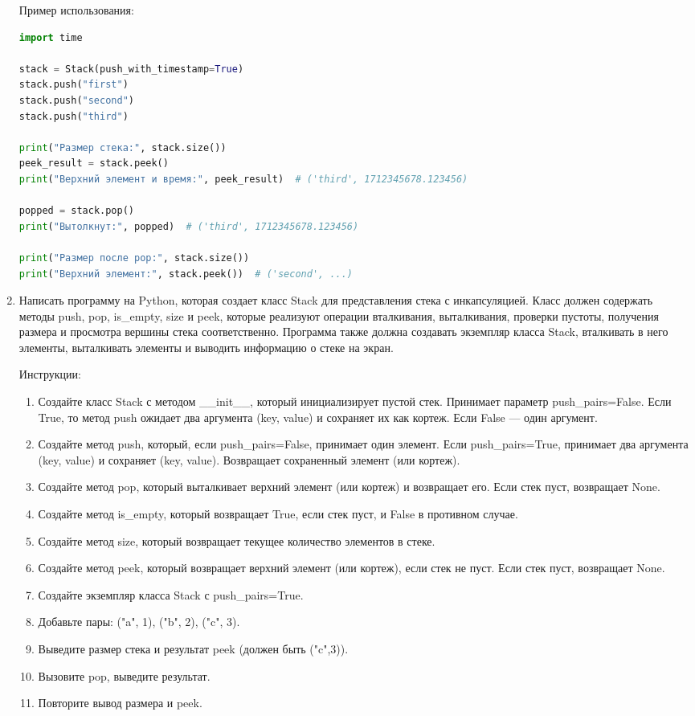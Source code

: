 \begin{enumerate}
Пример использования:
\begin{lstlisting}[language=Python]
import time

stack = Stack(push_with_timestamp=True)
stack.push("first")
stack.push("second")
stack.push("third")

print("Размер стека:", stack.size())
peek_result = stack.peek()
print("Верхний элемент и время:", peek_result)  # ('third', 1712345678.123456)

popped = stack.pop()
print("Вытолкнут:", popped)  # ('third', 1712345678.123456)

print("Размер после pop:", stack.size())
print("Верхний элемент:", stack.peek())  # ('second', ...)
\end{lstlisting}

\item Написать программу на Python, которая создает класс Stack для представления стека с инкапсуляцией. Класс должен содержать методы push, pop, is\_empty, size и peek, которые реализуют операции вталкивания, выталкивания, проверки пустоты, получения размера и просмотра вершины стека соответственно. Программа также должна создавать экземпляр класса Stack, вталкивать в него элементы, выталкивать элементы и выводить информацию о стеке на экран.

Инструкции:
\begin{enumerate}
    \item Создайте класс Stack с методом \_\_init\_\_, который инициализирует пустой стек. Принимает параметр push\_pairs=False. Если True, то метод push ожидает два аргумента (key, value) и сохраняет их как кортеж. Если False — один аргумент.
    \item Создайте метод push, который, если push\_pairs=False, принимает один элемент. Если push\_pairs=True, принимает два аргумента (key, value) и сохраняет (key, value). Возвращает сохраненный элемент (или кортеж).
    \item Создайте метод pop, который выталкивает верхний элемент (или кортеж) и возвращает его. Если стек пуст, возвращает None.
    \item Создайте метод is\_empty, который возвращает True, если стек пуст, и False в противном случае.
    \item Создайте метод size, который возвращает текущее количество элементов в стеке.
    \item Создайте метод peek, который возвращает верхний элемент (или кортеж), если стек не пуст. Если стек пуст, возвращает None.
    \item Создайте экземпляр класса Stack с push\_pairs=True.
    \item Добавьте пары: ("a", 1), ("b", 2), ("c", 3).
    \item Выведите размер стека и результат peek (должен быть ("c",3)).
    \item Вызовите pop, выведите результат.
    \item Повторите вывод размера и peek.
\end{enumerate}


\end{enumerate}
